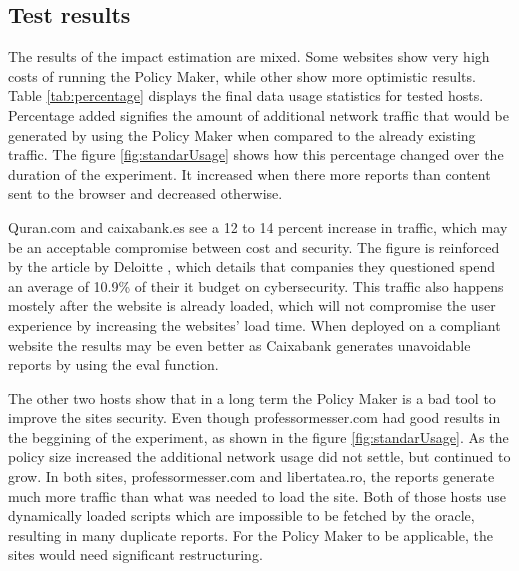 \begin{description}
\subsection{Test results}

The results of the impact estimation are mixed. 
Some websites show very high costs of running the Policy Maker, while other show more optimistic results.
Table \ref{tab:percentage} displays the final data usage statistics for tested hosts.
Percentage added signifies the amount of additional network traffic that would be generated by using the Policy Maker when compared to the already existing traffic.
The figure \ref{fig:standarUsage} shows how this percentage changed over the duration of the experiment.
It increased when there more reports than content sent to the browser and decreased otherwise.

Quran.com and caixabank.es see a 12 to 14 percent increase in traffic, which may be an acceptable compromise between cost and security.
The figure is reinforced by the article by Deloitte \cite{secSpend}, which details that companies they questioned spend an average of 10.9\% of their it budget on cybersecurity.
This traffic also happens mostely after the website is already loaded, which will not compromise the user experience by increasing the websites' load time.
When deployed on a compliant website the results may be even better as Caixabank generates unavoidable reports by using the eval function.


The other two hosts show that in a long term the Policy Maker is a bad tool to improve the sites security.
Even though professormesser.com had good results in the beggining of the experiment, as shown in the figure \ref{fig:standarUsage}.
As the policy size increased the additional network usage did not settle, but continued to grow.
In both sites, professormesser.com and libertatea.ro, the reports generate much more traffic than what was needed to load the site.
Both of those hosts use dynamically loaded scripts which are impossible to be fetched by the oracle, resulting in many duplicate reports.
For the Policy Maker to be applicable, the sites would need significant restructuring.


\end{description}
